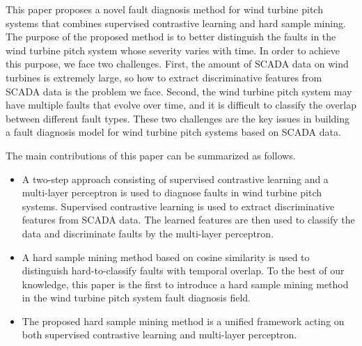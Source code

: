 \documentclass[lettersize,journal]{IEEEtran}
\begin{document}
This paper proposes a novel fault diagnosis method for wind turbine pitch systems that combines supervised contrastive learning and hard sample mining. The purpose of the proposed method is to better distinguish the faults in the wind turbine pitch system whose severity varies with time. In order to achieve this purpose, we face two challenges. First, the amount of SCADA data on wind turbines is extremely large, so how to extract discriminative features from SCADA data is the problem we face. Second, the wind turbine pitch system may have multiple faults that evolve over time, and it is difficult to classify the overlap between different fault types. These two challenges are the key issues in building a fault diagnosis model for wind turbine pitch systems based on SCADA data.

The main contributions of this paper can be summarized as follows.
\begin{itemize}
    \item A two-step approach consisting of supervised contrastive learning and a multi-layer perceptron is used to diagnose faults in wind turbine pitch systems. Supervised contrastive learning is used to extract discriminative features from SCADA data. The learned features are then used to classify the data and discriminate faults by the multi-layer perceptron.
    \item A hard sample mining method based on cosine similarity is used to distinguish hard-to-classify faults with temporal overlap. To the best of our knowledge, this paper is the first to introduce a hard sample mining method in the wind turbine pitch system fault diagnosis field.
    \item The proposed hard sample mining method is a unified framework acting on both supervised contrastive learning and multi-layer perceptron.
\end{itemize}
\end{document}
